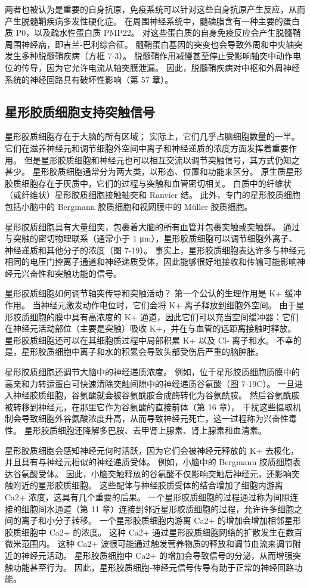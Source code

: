 两者也被认为是重要的自身抗原，免疫系统可以针对这些自身抗原产生反应，从而产生脱髓鞘疾病多发性硬化症。 在周围神经系统中，髓磷脂含有一种主要的蛋白质 P0，以及疏水性蛋白质 PMP22。 对这些蛋白质的自身免疫反应会产生脱髓鞘周围神经病，即吉兰-巴利综合征。 髓鞘蛋白基因的突变也会导致外周和中央轴突发生多种脱髓鞘疾病（方框 7-3）。 脱髓鞘作用减慢甚至停止受影响轴突中动作电位的传导，因为它允许电流从轴突膜泄漏。 因此，脱髓鞘疾病对中枢和外周神经系统的神经回路具有破坏性影响（第 57 章）。

\subsection{星形胶质细胞支持突触信号}
星形胶质细胞存在于大脑的所有区域； 实际上，它们几乎占脑细胞数量的一半。 它们在滋养神经元和调节细胞外空间中离子和神经递质的浓度方面发挥着重要作用。 但是星形胶质细胞和神经元也可以相互交流以调节突触信号，其方式仍知之甚少。 星形胶质细胞通常分为两大类，以形态、位置和功能来区分。 原生质星形胶质细胞存在于灰质中，它们的过程与突触和血管密切相关。 白质中的纤维状（或纤维状）星形胶质细胞接触轴突和 Ranvier 结。 此外，专门的星形胶质细胞包括小脑中的 Bergmann 胶质细胞和视网膜中的 Müller 胶质细胞。

星形胶质细胞具有大量细突，包裹着大脑的所有血管并包裹突触或突触群。 通过与突触的密切物理联系（通常小于 1 μm），星形胶质细胞可以调节细胞外离子、神经递质和其他分子的浓度（图 7-19）。 事实上，星形胶质细胞表达许多与神经元相同的电压门控离子通道和神经递质受体，因此能够很好地接收和传输可能影响神经元兴奋性和突触功能的信号。

星形胶质细胞如何调节轴突传导和突触活动？ 第一个公认的生理作用是 K+ 缓冲作用。 当神经元激发动作电位时，它们会将 K+ 离子释放到细胞外空间。 由于星形胶质细胞的膜中具有高浓度的 K+ 通道，因此它们可以充当空间缓冲器：它们在神经元活动部位（主要是突触）吸收 K+，并在与血管的远距离接触时释放。 星形胶质细胞还可以在其细胞质过程中局部积累 K+ 以及 Cl- 离子和水。 不幸的是，星形胶质细胞中离子和水的积累会导致头部受伤后严重的脑肿胀。

星形胶质细胞还调节大脑中的神经递质浓度。 例如，位于星形胶质细胞质膜中的高亲和力转运蛋白可快速清除突触间隙中的神经递质谷氨酸（图 7-19C）。 一旦进入神经胶质细胞，谷氨酸就会被谷氨酰胺合成酶转化为谷氨酰胺。 然后谷氨酰胺被转移到神经元，在那里它作为谷氨酸的直接前体（第 16 章）。 干扰这些摄取机制会导致细胞外谷氨酸浓度升高，从而导致神经元死亡，这一过程称为兴奋性毒性。 星形胶质细胞还降解多巴胺、去甲肾上腺素、肾上腺素和血清素。

星形胶质细胞会感知神经元何时活跃，因为它们会被神经元释放的 K+ 去极化，并且具有与神经元相似的神经递质受体。 例如，小脑中的 Bergmann 胶质细胞表达谷氨酸受体。 因此，小脑突触释放的谷氨酸不仅影响突触后神经元，还影响突触附近的星形胶质细胞。 这些配体与神经胶质受体的结合增加了细胞内游离 Ca2+ 浓度，这具有几个重要的后果。 一个星形胶质细胞的过程通过称为间隙连接的细胞间水通道（第 11 章）连接到邻近星形胶质细胞的过程，允许许多细胞之间的离子和小分子转移。 一个星形胶质细胞内游离 Ca2+ 的增加会增加相邻星形胶质细胞中 Ca2+ 的浓度。 这种 Ca2+ 通过星形胶质细胞网络的扩散发生在数百微米范围内。 这种 Ca2+ 波很可能通过触发营养物质的释放和调节血流来调节附近的神经元活动。 星形胶质细胞中 Ca2+ 的增加会导致信号的分泌，从而增强突触功能甚至行为。 因此，星形胶质细胞-神经元信号传导有助于正常的神经回路功能。

